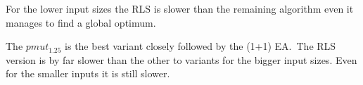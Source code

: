 

For the lower input sizes the RLS is slower than the remaining algorithm even it manages to find a global optimum.



The $pmut_{1.25}$ is the best variant closely followed by the (1+1) EA.\
The RLS version is by far slower than the other to variants for the bigger input sizes.
Even for the smaller inputs it is still slower.
